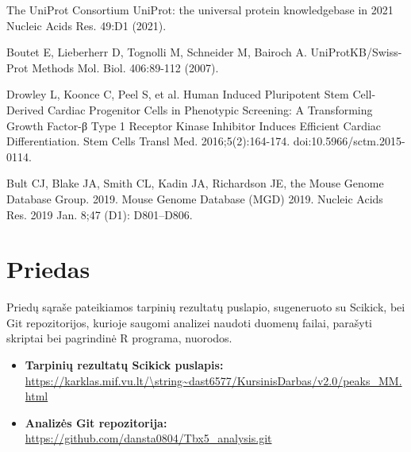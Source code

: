 \documentclass[12pt]{article}
\begin{document}
\begin{thebibliography}{99}
 The UniProt Consortium UniProt: the universal protein
knowledgebase in 2021 Nucleic Acids Res. 49:D1 (2021).

 Boutet E, Lieberherr D, Tognolli M, Schneider M, Bairoch A.
UniProtKB/Swiss-Prot Methods Mol. Biol. 406:89-112 (2007).

 Drowley L, Koonce C, Peel S, et al. Human
Induced Pluripotent Stem Cell-Derived Cardiac Progenitor Cells in Phenotypic
Screening: A Transforming Growth Factor-β Type 1 Receptor Kinase Inhibitor
Induces Efficient Cardiac Differentiation. Stem Cells Transl Med.
2016;5(2):164-174. doi:10.5966/sctm.2015-0114.

 Bult CJ, Blake JA, Smith CL, Kadin JA, Richardson JE, the
Mouse Genome Database Group. 2019. Mouse Genome Database (MGD) 2019.
Nucleic Acids Res. 2019 Jan. 8;47 (D1): D801–D806.

\end{thebibliography}

\newpage


\section{Priedas} \label{Priedas}

Priedų sąraše pateikiamos tarpinių rezultatų puslapio, sugeneruoto su Scikick,
bei Git repozitorijos, kurioje saugomi analizei naudoti duomenų failai,
parašyti skriptai bei pagrindinė R programa, nuorodos.

\begin{itemize}
    \item \textbf{Tarpinių rezultatų Scikick puslapis:}\\
        \url{https://karklas.mif.vu.lt/\string~dast6577/KursinisDarbas/v2.0/peaks\_MM.html}
    \item \textbf{Analizės Git repozitorija:}\\
        \url{https://github.com/dansta0804/Tbx5\_analysis.git}
  \end{itemize}
\end{document}

